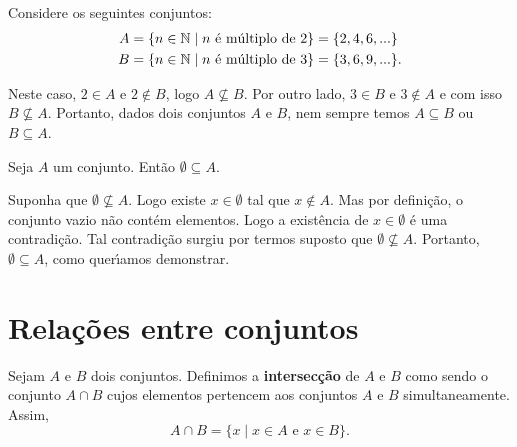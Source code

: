 Considere os seguintes conjuntos:
\begin{align*}
	A &= \{ n \in \mathbb{N} \mid n \mbox{ {\'e} m{\'u}ltiplo de } 2\} = \{2,4,6,...\}\\
	B &= \{n \in \mathbb{N} \mid n \mbox{ {\'e} m{\'u}ltiplo de } 3\} = \{3,6,9,...\}.
\end{align*}


Neste caso, $2 \in A$ e $2 \notin B$, logo $A \nsubseteq B$. Por outro lado, $3 \in B$ e $3 \notin A$ e com isso $B \nsubseteq A$. Portanto, dados dois conjuntos $A$ e $B$, nem sempre temos $A \subseteq B$ ou $B \subseteq A$.

\begin{proposicao}
	Seja $A$ um conjunto. Ent{\~a}o $ \emptyset \subseteq A$.
\end{proposicao}
\begin{prova}
	Suponha que $\emptyset \nsubseteq A$. Logo existe $x \in \emptyset$ tal que $x \notin A$. Mas por defini{\c c}{\~a}o, o conjunto vazio n{\~a}o cont{\'e}m elementos. Logo a exist\^encia de $x \in \emptyset$ {\'e} uma contradi{\c c}{\~a}o. Tal contradi\c{c}\~ao surgiu por termos suposto que $\emptyset \nsubseteq A$. Portanto, $\emptyset \subseteq A$, como quer{\'\i}amos demonstrar.
\end{prova}

\section{Rela{\c c}{\~o}es entre conjuntos}

\begin{definicao}\label{intersecao_conjunto}
	Sejam $A$ e $B$ dois conjuntos. Definimos a \textbf{intersec{\c c}{\~a}o} de $A$ e $B$ como sendo o conjunto $A \cap B$ cujos elementos pertencem aos conjuntos $A$ e $B$ simultaneamente. Assim,
	\[
		A \cap B = \{x \mid x \in A\mbox{ e }  x \in B\}.
	\]

\end{definicao}

